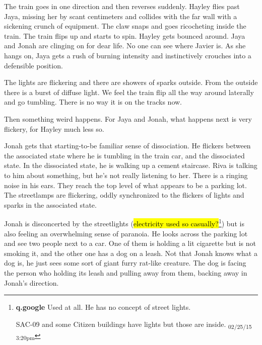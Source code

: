 The train goes in one direction and then reverses suddenly.  Hayley flies past Jaya, missing her by scant centimeters and collides with the far wall with a sickening crunch of equipment.  The claw snaps and goes ricocheting inside the train.  The train flips up and starts to spin.  Hayley gets bounced around.  Jaya and Jonah are clinging on for dear life.  No one can see where Javier is.  As she hangs on, Jaya gets a rush of burning intensity and instinctively crouches into a defensible position.



The lights are flickering and there are showers of sparks outside.  From the outside there is a burst of diffuse light.  We feel the train flip all the way around laterally and go tumbling. There is no way it is on the tracks now.



Then something weird happens.  For Jaya and Jonah, what happens next is very flickery, for Hayley much less so.





Jonah gets that starting-to-be familiar sense of dissociation.  He flickers between the associated state where he is tumbling in the train car, and the dissociated state.  In the dissociated state, he is walking up a cement staircase.  Riva is talking to him about something, but he's not really listening to her.  There is a ringing noise in his ears. They reach the top level of what appears to be a parking lot.  The streetlamps are flickering, oddly synchronized to the flickers of lights and sparks in the associated state.



Jonah is disconcerted by the streetlights (\hl{electricity used so casually?}\footnote{\textbf{q.google }Used at all.  He has no concept of street lights.

SAC-09 and some Citizen buildings have lights but those are inside. \textsubscript{02/25/15 3:20pm}}) but is also feeling an overwhelming sense of paranoia.  He looks across the parking lot and see two people next to a car.  One of them is holding a lit cigarette but is not smoking it, and the other one has a dog on a leash.  Not that Jonah knows what a dog is, he just sees some sort of giant furry rat-like creature.  The dog is facing the person who holding its leash and pulling away from them, backing away in Jonah's direction.



